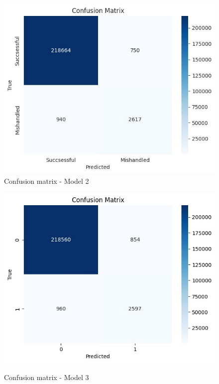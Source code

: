 \documentclass[12pt]{article}
\begin{document}
\begin{figure}
\begin{minipage}[c]{0.45\linewidth}
    \includegraphics[width=1\textwidth]{Confusion_matrix_Model 2.jpg}\\
    \caption{Confusion matrix - Model 2}
\end{minipage}%
\hfill
\begin{minipage}[c]{0.45\linewidth}
\includegraphics[width=1\textwidth]{Confusion_matrix_Model 3.jpg}\\
\caption{Confusion matrix - Model 3}
\end{minipage}

\end{figure}
\end{document}
